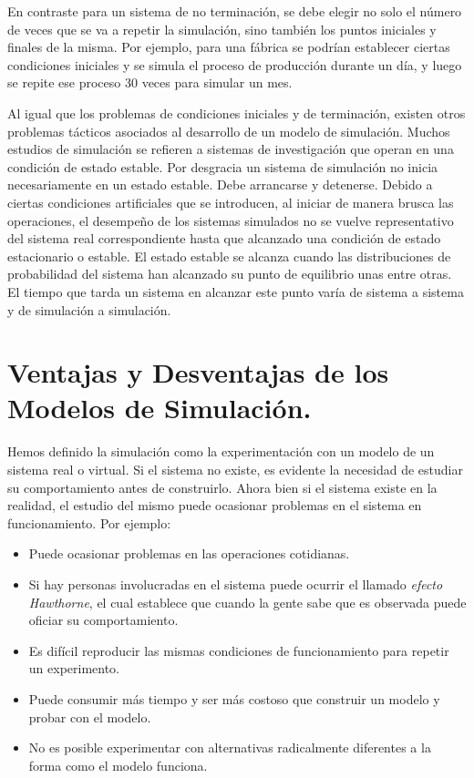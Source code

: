 En contraste para un sistema de no terminación, se debe elegir no solo el número de veces que se va a repetir la simulación, sino también los puntos iniciales y finales de la misma. Por ejemplo, para una fábrica se podrían establecer ciertas condiciones iniciales y se simula el proceso de producción durante un día, y luego se repite ese proceso 30 veces para simular un mes.

Al igual que los problemas de condiciones iniciales y de terminación, existen otros problemas tácticos asociados al desarrollo de un modelo de simulación. Muchos estudios de simulación se refieren a sistemas de investigación que operan en una condición de estado estable. Por desgracia un sistema de simulación no inicia necesariamente en un estado estable. Debe arrancarse y detenerse. Debido a ciertas condiciones artificiales que se introducen, al iniciar de manera brusca las operaciones, el desempeño de los sistemas simulados no se vuelve representativo del sistema real correspondiente hasta que alcanzado una condición de estado estacionario o estable. El estado estable se alcanza cuando las distribuciones de probabilidad del sistema han alcanzado su punto de equilibrio unas entre otras. El tiempo que tarda un sistema en alcanzar este punto varía de sistema a sistema y de simulación a simulación.



\section{Ventajas y Desventajas de los Modelos de Simulación.}

Hemos definido la simulación como la experimentación con un modelo de un sistema real o virtual. Si el sistema no existe, es evidente la necesidad de estudiar su comportamiento antes de construirlo. Ahora bien si el sistema existe en la realidad, el estudio del mismo puede ocasionar problemas en el sistema en funcionamiento. Por ejemplo:
\begin{itemize}

\item Puede ocasionar problemas en las operaciones cotidianas.

\item Si hay personas involucradas en el sistema puede ocurrir el llamado \textit{efecto Hawthorne}, el cual establece que cuando la gente sabe que es observada puede oficiar su comportamiento.

\item Es difícil reproducir las mismas condiciones de funcionamiento para repetir un experimento.

\item Puede consumir más tiempo y ser más costoso que construir un modelo y probar con el modelo.

\item No es posible experimentar con alternativas radicalmente diferentes a la forma como el modelo funciona.
\end{itemize}

